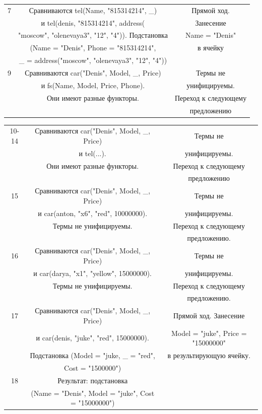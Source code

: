 \documentclass[12pt]{report}
\begin{document}
\begin{table}[H]
\begin{center}
\begin{tabular}{|c c c |}
			\hline
			7 & Сравниваются tel(Name, "815314214", \_) & Прямой ход. \\
			  & и tel(denis, "815314214", address( & Занесение \\
			  & "moscow", "olenevaya3", "12", "4")). Подстановка & Name = "Denis"{} \\
			  & (Name = "Denis", Phone = "815314214"{}, & в ячейку\\
			  & \_ = address("moscow", "olenevaya3", "12", "4"{})) &\\
			\hline
			9 & Сравниваются car("Denis", Model, \_, Price) & Термы не \\
			  & и fs(Name, Model, Price, Phone). & унифицируемы. \\
			  & Они имеют разные функторы. &Переход к следующему \\
			  & & предложению\\
\hline
\end{tabular}
	\end{center}
\end{table}
\begin{table}[H]
	\begin{center}
		\begin{tabular}{|c c c |} 
			\hline
			10-14 & Сравниваются car("Denis", Model, \_, Price) & Термы не \\
			  & и tel(...). & унифицируемы. \\
			  & Они имеют разные функторы. &Переход к следующему \\
			  & & предложению\\
			\hline
			15 & Сравниваются car("Denis", Model, \_, Price) & Термы не \\
			  & и car(anton, "x6", "red", 10000000). & унифицируемы. \\
			  & Термы не унифицируемы. & Переход к следующему \\
			  & & предложению. \\
			\hline
			16 & Сравниваются car("Denis", Model, \_, Price) & Термы не \\
			  & и car(darya, "x1", "yellow", 15000000). & унифицируемы. \\
			  & Термы не унифицируемы. & Переход к следующему \\
			  & & предложению. \\
			\hline
			17 & Сравниваются car("Denis", Model, \_, Price) & Прямой ход. Занесение \\
			  & и car(denis, "juke", "red", 15000000). & Model = "juke"{}, Price = "15000000"{}\\
			  & Подстановка (Model = "juke, \_ = "red",  & в результирующую ячейку. \\
			  & Cost = "1500000")  & \\
			\hline
			18 & Результат: подстановка & \\
			   & (Name = "Denis"{}, Model = "juke"{}, Cost = "15000000"{}) & \\
			\hline
		\end{tabular}
	\end{center}
\end{table}
\end{document}
